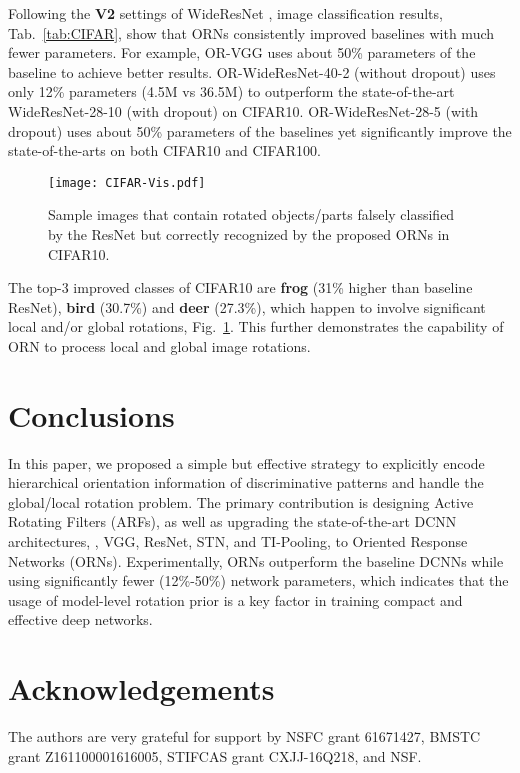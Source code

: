\documentclass[10pt,twocolumn,letterpaper]{article}
\begin{document}
    Following the \textbf{V2} settings of WideResNet \cite{Zagoruyko2016}, image classification results, Tab.~\ref{tab:CIFAR}, show that ORNs consistently improved baselines with much fewer parameters.
    For example, OR-VGG uses about 50\% parameters of the baseline to achieve better results. OR-WideResNet-40-2 (without dropout) uses only 12\% parameters (4.5M vs 36.5M) to outperform the state-of-the-art WideResNet-28-10 (with dropout) on CIFAR10. OR-WideResNet-28-5 (with dropout) uses about 50\% parameters of the baselines yet significantly improve the state-of-the-arts on both CIFAR10 and CIFAR100.
    \begin{figure}
        \begin{center}
            \texttt{[image: CIFAR-Vis.pdf]}
        \end{center}
        \caption{Sample images that contain rotated objects/parts falsely classified by the ResNet but correctly recognized by the proposed ORNs in CIFAR10.}
    \label{fig:CIFAR-Vis}
    \vspace{-0.5em}
    \end{figure}
    The top-3 improved classes of CIFAR10 are \textbf{frog} (31\% higher than baseline ResNet), \textbf{bird} (30.7\%) and \textbf{deer} (27.3\%), which happen to involve significant local and/or global rotations, Fig.~\ref{fig:CIFAR-Vis}. This further demonstrates the capability of ORN to process local and global image rotations.
\section{Conclusions}
    In this paper, we proposed a simple but effective strategy to explicitly encode hierarchical orientation information of discriminative patterns and handle the global/local rotation problem. The primary contribution is designing Active Rotating Filters (ARFs), as well as upgrading the state-of-the-art DCNN architectures, \eg, VGG, ResNet, STN, and TI-Pooling, to Oriented Response Networks (ORNs). Experimentally, ORNs outperform the baseline DCNNs while using significantly fewer (12\%-50\%) network parameters, which indicates that the usage of model-level rotation prior is a key factor in training compact and effective deep networks.

\section*{Acknowledgements}
    The authors are very grateful for support by NSFC grant 61671427, BMSTC grant Z161100001616005, STIFCAS grant CXJJ-16Q218, and NSF.

{\small


}
\end{document}
